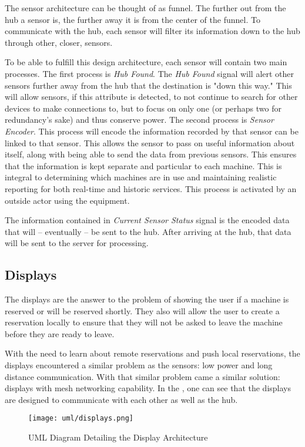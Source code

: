 \documentclass[PPFS.tex]{template/subfiles}
\newcommand{\sn}[1]{\textit{#1}}
\begin{document}
The sensor architecture can be thought of as funnel. The further out from the hub a sensor is, the further away it is from the center of the funnel. To communicate with the hub, each sensor will filter its information down to the hub through other, closer, sensors.

To be able to fulfill this design architecture, each sensor will contain two main processes. The first process is \sn{Hub Found}. The \sn{Hub Found} signal will alert other sensors further away from the hub that the destination is "down this way." This will allow sensors, if this attribute is detected, to not continue to search for other devices to make connections to, but to focus on only one (or perhaps two for redundancy's sake) and thus conserve power. The second process is \sn{Sensor Encoder}. This process will encode the information recorded by that sensor can be linked to that sensor. This allows the sensor to pass on useful information about itself,  along with being able to send the data from previous sensors. This ensures that the information is kept separate and particular to each machine. This is integral to determining which machines are in use and maintaining realistic reporting for both real-time and historic services. This process is activated by an outside actor using the equipment.

The information contained in \sn{Current Sensor Status} signal is the encoded data that will -- eventually -- be sent to the hub. After arriving at the hub, that data will be sent to the server for processing.

\subsection{Displays}

The displays are the answer to the problem of showing the user if a machine is reserved or will be reserved shortly. They also will allow the user to create a reservation locally to ensure that they will not be asked to leave the machine before they are ready to leave.

With the need to learn about remote reservations and push local reservations, the displays encountered a similar problem as the sensors: low power and long distance communication. With that similar problem came a similar solution: displays with mesh networking capability. In the , one can see that the displays are designed to communicate with each other as well as the hub.

\begin{figure}[H]
    \centering
    \texttt{[image: uml/displays.png]}
    \caption{UML Diagram Detailing the Display Architecture}
    \label{fig:display_arch}
\end{figure}
\end{document}
